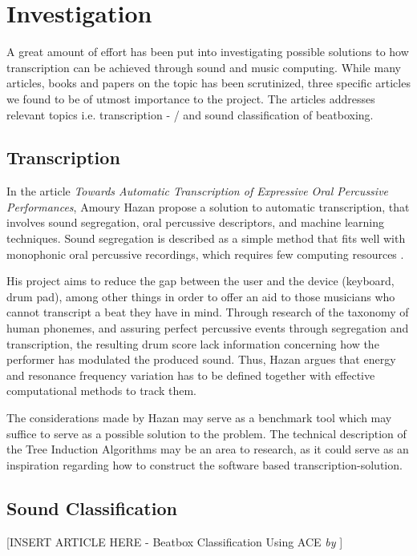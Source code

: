 \section{Investigation}
A great amount of effort has been put into investigating possible solutions to how transcription can be achieved through sound and music computing. While many articles, books and papers on the topic has been scrutinized, three specific articles we found to be of utmost importance to the project. The articles addresses relevant topics i.e. transcription - / and sound classification of beatboxing.

\subsection{Transcription}
In the article \textit{Towards Automatic Transcription of Expressive Oral Percussive Performances}, Amoury Hazan propose a solution to automatic transcription, that involves sound segregation, oral percussive descriptors, and machine learning techniques. Sound segregation is described as a simple method that fits well with monophonic oral percussive recordings, which requires few computing resources \citep{Hazan2005a}.	

His project aims to reduce the gap between the user and the device (keyboard, drum pad), among other things in order to offer an aid to those musicians who cannot transcript a beat they have in mind.
Through research of the taxonomy of human phonemes, and assuring perfect percussive events through segregation and transcription, the resulting drum score lack information concerning how the performer has modulated the produced sound. Thus, Hazan argues that energy and resonance frequency variation has to be defined together with effective computational methods to track them.
	
The considerations made by Hazan may serve as a benchmark tool which may suffice to serve as a possible solution to the problem. The technical description of the Tree Induction Algorithms may be an area to research, as it could serve as an inspiration regarding how to construct the software based transcription-solution.

\subsection{Sound Classification}

[INSERT ARTICLE HERE - Beatbox Classification Using ACE \textit{by} \citep{Sinyor05} ]

